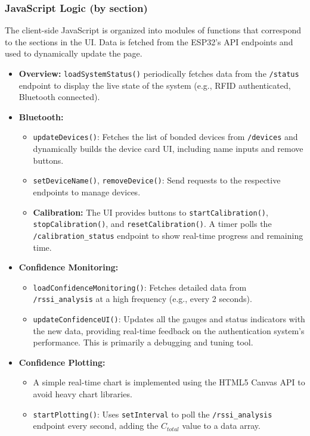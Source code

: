 \documentclass{article}
\begin{document}
\subsubsection{JavaScript Logic (by section)}
The client-side JavaScript is organized into modules of functions that correspond to the sections in the UI. Data is fetched from the ESP32's API endpoints and used to dynamically update the page.
\begin{itemize}
    \item \textbf{Overview:} \texttt{loadSystemStatus()} periodically fetches data from the \texttt{/status} endpoint to display the live state of the system (e.g., RFID authenticated, Bluetooth connected).
    \item \textbf{Bluetooth:}
    \begin{itemize}
        \item \texttt{updateDevices()}: Fetches the list of bonded devices from \texttt{/devices} and dynamically builds the device card UI, including name inputs and remove buttons.
        \item \texttt{setDeviceName()}, \texttt{removeDevice()}: Send requests to the respective endpoints to manage devices.
        \item \textbf{Calibration:} The UI provides buttons to \texttt{startCalibration()}, \texttt{stopCalibration()}, and \texttt{resetCalibration()}. A timer polls the \texttt{/calibration\_status} endpoint to show real-time progress and remaining time.
    \end{itemize}
    \item \textbf{Confidence Monitoring:}
    \begin{itemize}
        \item \texttt{loadConfidenceMonitoring()}: Fetches detailed data from \texttt{/rssi\_analysis} at a high frequency (e.g., every 2 seconds).
        \item \texttt{updateConfidenceUI()}: Updates all the gauges and status indicators with the new data, providing real-time feedback on the authentication system's performance. This is primarily a debugging and tuning tool.
    \end{itemize}
    \item \textbf{Confidence Plotting:}
    \begin{itemize}
        \item A simple real-time chart is implemented using the HTML5 Canvas API to avoid heavy chart libraries.
        \item \texttt{startPlotting()}: Uses \texttt{setInterval} to poll the \texttt{/rssi\_analysis} endpoint every second, adding the $C_{total}$ value to a data array.

\end{itemize}
\end{itemize}
\end{document}
